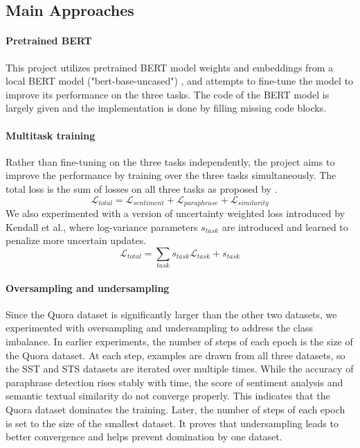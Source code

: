 \documentclass{article}
\begin{document}
  \subsection{Main Approaches}

    \paragraph{Pretrained BERT}
      This project utilizes pretrained BERT model weights and embeddings from a local BERT model ("bert-base-uncased") \cite{devlin2019bert}, and attempts to fine-tune the model to improve its performance on the three tasks.
      The code of the BERT model is largely given and the implementation is done by filling missing code blocks. 

    \paragraph{Multitask training}
      Rather than fine-tuning on the three tasks independently, the project aims to improve the performance by training over the three tasks simultaneously.
      The total loss is the sum of losses on all three tasks as proposed by \cite{bi2022mtrec}.
      \begin{equation}
        \mathcal{L}_{total} = \mathcal{L}_{sentiment} + \mathcal{L}_{paraphrase} + \mathcal{L}_{similarity}
      \end{equation}
      We also experimented with a version of uncertainty weighted loss introduced by Kendall et al.\cite{kendall2018multi},
      where  log-variance parameters $s_{task}$ are introduced and learned to penalize more uncertain updates.
      \begin{equation}
        \mathcal{L}_{total} = \sum_{task} s_{task} \mathcal{L}_{task} + s_{task}
      \end{equation}

    \paragraph{Oversampling and undersampling}
      Since the Quora dataset is significantly larger than the other two datasets, we experimented with oversampling and undersampling to address the class imbalance\cite{mohammed2020machine}.
      In earlier experiments, the number of steps of each epoch is the size of the Quora dataset.
      At each step, examples are drawn from all three datasets, so the SST and STS datasets are iterated over multiple times.
      While the accuracy of paraphrase detection rises stably with time, the score of sentiment analysis and semantic textual similarity do not converge properly.
      This indicates that the Quora dataset dominates the training.
      Later, the number of steps of each epoch is set to the size of the smallest dataset.
      It proves that undersampling leads to better convergence and helps prevent domination by one dataset.
\end{document}
